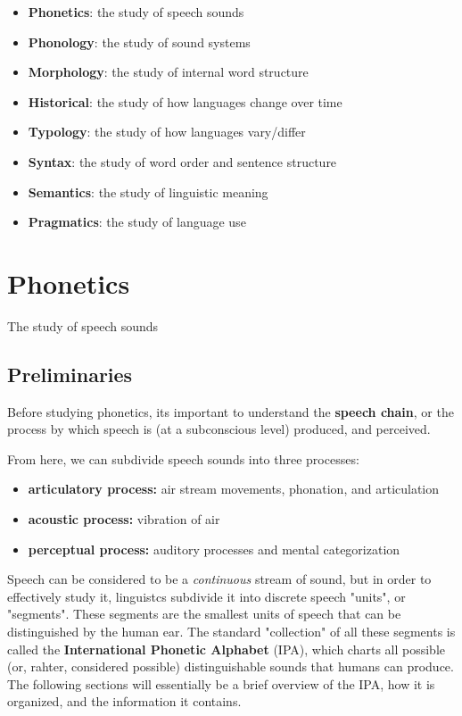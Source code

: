 \documentclass[12pt]{article}
\begin{document}
\begin{itemize}
  \item \textbf{Phonetics}: the study of speech sounds
  \item \textbf{Phonology}: the study of sound systems
  \item \textbf{Morphology}: the study of internal word structure
  \item \textbf{Historical}: the study of how languages change over time
  \item \textbf{Typology}: the study of how languages vary/differ
  \item \textbf{Syntax}: the study of word order and sentence structure
  \item \textbf{Semantics}: the study of linguistic meaning
  \item \textbf{Pragmatics}: the study of language use
\end{itemize}

\section{Phonetics}

\begin{definitionEnd}[Phonetics]
  The study of speech sounds
\end{definitionEnd}
\subsection{Preliminaries}

Before studying phonetics, its important to understand the \textbf{speech chain}, or the process by which speech is (at a subconscious level) produced, and perceived.


From here, we can subdivide speech sounds into three processes:

\begin{itemize}
  \item \textbf{articulatory process:} air stream movements, phonation, and articulation
  \item \textbf{acoustic process:} vibration of air
  \item \textbf{perceptual process:} auditory processes and mental categorization
\end{itemize}

Speech can be considered to be a \textit{continuous} stream of sound, but in order to effectively study it, linguistcs subdivide it into discrete speech "units", or "segments". These segments are the smallest units of speech that can be distinguished by the human ear. The standard "collection" of all these segments is called the \textbf{International Phonetic Alphabet} (IPA), which charts all possible (or, rahter, considered possible) distinguishable sounds that humans can produce. The following sections will essentially be a brief overview of the IPA, how it is organized, and the information it contains. 
\end{document}
